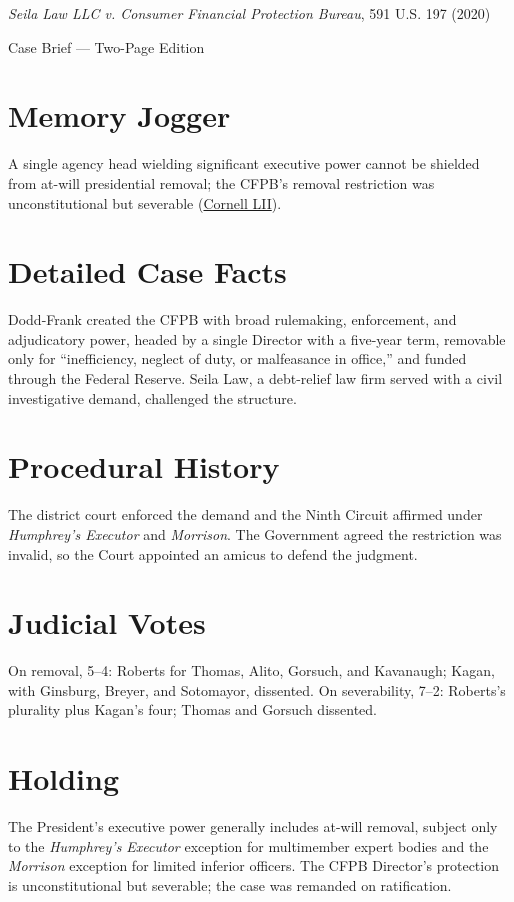 \documentclass[12pt]{article}
\begin{document}
\begin{center}
{\LARGE \textit{Seila Law LLC v. Consumer Financial Protection Bureau}, 591 U.S. 197 (2020)\par}
\vspace{0.5em}
{\large Case Brief --- Two-Page Edition\par}
\end{center}

\section{Memory Jogger}
A single agency head wielding significant executive power cannot be shielded from at-will presidential removal; the CFPB's removal restriction was unconstitutional but severable (\href{https://www.law.cornell.edu/supremecourt/text/19-7}{Cornell LII}).

\section{Detailed Case Facts}
Dodd-Frank created the CFPB with broad rulemaking, enforcement, and adjudicatory power, headed by a single Director with a five-year term, removable only for ``inefficiency, neglect of duty, or malfeasance in office,'' and funded through the Federal Reserve. Seila Law, a debt-relief law firm served with a civil investigative demand, challenged the structure.

\section{Procedural History}
The district court enforced the demand and the Ninth Circuit affirmed under \textit{Humphrey's Executor} and \textit{Morrison}. The Government agreed the restriction was invalid, so the Court appointed an amicus to defend the judgment.

\section{Judicial Votes}
On removal, 5--4: Roberts for Thomas, Alito, Gorsuch, and Kavanaugh; Kagan, with Ginsburg, Breyer, and Sotomayor, dissented. On severability, 7--2: Roberts's plurality plus Kagan's four; Thomas and Gorsuch dissented.

\section{Holding}
The President's executive power generally includes at-will removal, subject only to the \textit{Humphrey's Executor} exception for multimember expert bodies and the \textit{Morrison} exception for limited inferior officers. The CFPB Director's protection is unconstitutional but severable; the case was remanded on ratification.
\end{document}
